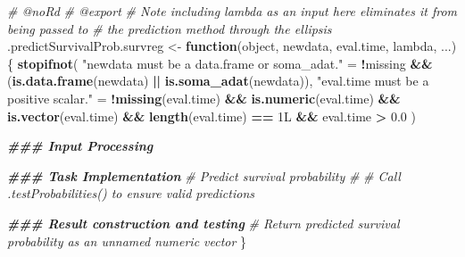 \documentclass[
]{book}
\newenvironment{Shaded}{\begin{snugshade}}{\end{snugshade}}
\newcommand{\CommentTok}[1]{\textcolor[rgb]{0.56,0.35,0.01}{\textit{#1}}}
\newcommand{\ControlFlowTok}[1]{\textcolor[rgb]{0.13,0.29,0.53}{\textbf{#1}}}
\newcommand{\DocumentationTok}[1]{\textcolor[rgb]{0.56,0.35,0.01}{\textbf{\textit{#1}}}}
\newcommand{\FloatTok}[1]{\textcolor[rgb]{0.00,0.00,0.81}{#1}}
\newcommand{\FunctionTok}[1]{\textcolor[rgb]{0.13,0.29,0.53}{\textbf{#1}}}
\newcommand{\NormalTok}[1]{#1}
\newcommand{\OtherTok}[1]{\textcolor[rgb]{0.56,0.35,0.01}{#1}}
\newcommand{\SpecialCharTok}[1]{\textcolor[rgb]{0.81,0.36,0.00}{\textbf{#1}}}
\newcommand{\StringTok}[1]{\textcolor[rgb]{0.31,0.60,0.02}{#1}}
\begin{document}
\begin{Shaded}
\begin{Highlighting}[]
\CommentTok{\#\textquotesingle{} @noRd}
\CommentTok{\#\textquotesingle{} @export}
\CommentTok{\#\textquotesingle{} Note including lambda as an input here eliminates it from being passed to}
\CommentTok{\#\textquotesingle{}   the prediction method through the ellipsis}
\NormalTok{.predictSurvivalProb.survreg }\OtherTok{\textless{}{-}} \ControlFlowTok{function}\NormalTok{(object, newdata, eval.time, }
\NormalTok{                                         lambda, ...) \{}
  \FunctionTok{stopifnot}\NormalTok{(}
    \StringTok{"\textasciigrave{}newdata\textasciigrave{} must be a data.frame or soma\_adat."} \OtherTok{=} 
      \SpecialCharTok{!}\NormalTok{missing }\SpecialCharTok{\&\&}\NormalTok{ (}\FunctionTok{is.data.frame}\NormalTok{(newdata) }\SpecialCharTok{||} \FunctionTok{is.soma\_adat}\NormalTok{(newdata)),}
    \StringTok{"\textasciigrave{}eval.time\textasciigrave{} must be a positive scalar."} \OtherTok{=} 
      \SpecialCharTok{!}\FunctionTok{missing}\NormalTok{(eval.time) }\SpecialCharTok{\&\&} \FunctionTok{is.numeric}\NormalTok{(eval.time) }\SpecialCharTok{\&\&} 
        \FunctionTok{is.vector}\NormalTok{(eval.time) }\SpecialCharTok{\&\&} \FunctionTok{length}\NormalTok{(eval.time) }\SpecialCharTok{==}\NormalTok{ 1L }\SpecialCharTok{\&\&}\NormalTok{ eval.time }\SpecialCharTok{\textgreater{}} \FloatTok{0.0}
\NormalTok{  )}
  
  \DocumentationTok{\#\#\# Input Processing}
  
  \DocumentationTok{\#\#\# Task Implementation}
  \CommentTok{\# Predict survival probability}
  \CommentTok{\#}
  \CommentTok{\# Call .testProbabilities() to ensure valid predictions}
  
  \DocumentationTok{\#\#\# Result construction and testing}
  \CommentTok{\# Return predicted survival probability as an unnamed numeric vector}
\NormalTok{\}}


\end{Highlighting}
\end{Shaded}
\end{document}
